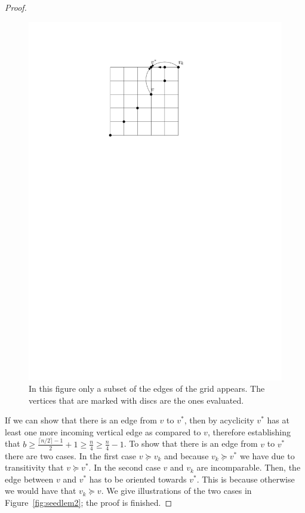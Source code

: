 \documentclass[a4paper,10pt]{article}
\begin{document}
\begin{proof}
\begin{figure}[htbp]
  	\includegraphics[scale=0.7]{seedlemma_fig1.pdf}
  	\caption{In this figure only a subset of the edges of the grid appears. The vertices that are marked with discs are the ones evaluated.} 
  	\label{fig:seedlem1}
  \end{figure}
   If we can show that there is an edge from $v$ to $v^*$, then by acyclicity $v^*$ has at least one more incoming vertical edge as compared to $v$, therefore establishing that $b \geq \frac{\lceil n/2\rceil-1}{2} + 1 \geq \frac{n}{4} \geq \frac{n}{4} - 1$. To show that there is an edge from $v$ to $v^*$ there are two cases. In the first case $v \succeq v_k$ and because $v_k \succeq v^*$ we have due to transitivity that $v \succeq v^*$. In the second case $v$ and $v_k$ are incomparable. Then, the edge between $v$ and $v^*$ has to be oriented towards $v^*$. This is because otherwise we would have that $v_k \succeq v$. We give illustrations of the two cases in Figure~\ref{fig:seedlem2}; the proof is finished. 

\end{proof}
\end{document}
